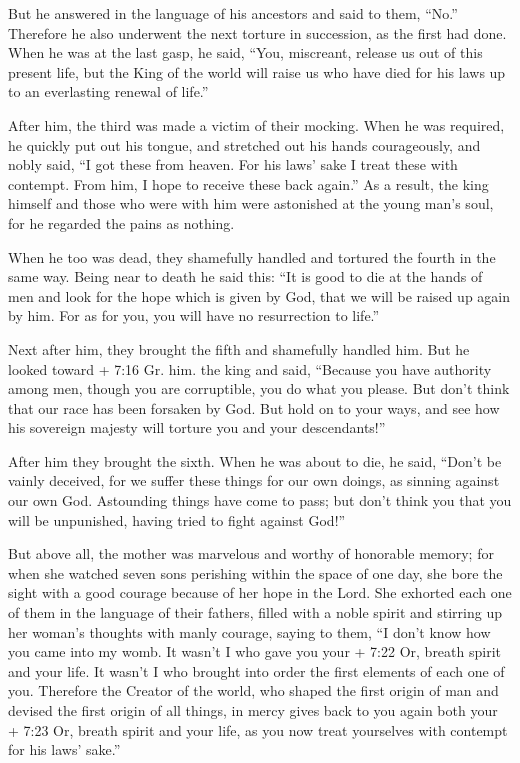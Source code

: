  But he answered in the language of his ancestors and said
to them, ``No.'' Therefore he also underwent the next torture in
succession, as the first had done.  When he was at the last
gasp, he said, ``You, miscreant, release us out of this present life,
but the King of the world will raise us who have died for his laws up to
an everlasting renewal of life.''

 After him, the third was made a victim of their mocking.
When he was required, he quickly put out his tongue, and stretched out
his hands courageously,  and nobly said, ``I got these from
heaven. For his laws' sake I treat these with contempt. From him, I hope
to receive these back again.''  As a result, the king
himself and those who were with him were astonished at the young man's
soul, for he regarded the pains as nothing.

 When he too was dead, they shamefully handled and tortured
the fourth in the same way.  Being near to death he said
this: ``It is good to die at the hands of men and look for the hope
which is given by God, that we will be raised up again by him. For as
for you, you will have no resurrection to life.''

 Next after him, they brought the fifth and shamefully
handled him.  But he looked toward + 7:16 Gr. him. the king
and said, ``Because you have authority among men, though you are
corruptible, you do what you please. But don't think that our race has
been forsaken by God.  But hold on to your ways, and see
how his sovereign majesty will torture you and your descendants!''

 After him they brought the sixth. When he was about to
die, he said, ``Don't be vainly deceived, for we suffer these things for
our own doings, as sinning against our own God. Astounding things have
come to pass;  but don't think you that you will be
unpunished, having tried to fight against God!''

 But above all, the mother was marvelous and worthy of
honorable memory; for when she watched seven sons perishing within the
space of one day, she bore the sight with a good courage because of her
hope in the Lord.  She exhorted each one of them in the
language of their fathers, filled with a noble spirit and stirring up
her woman's thoughts with manly courage, saying to them, 
``I don't know how you came into my womb. It wasn't I who gave you your
+ 7:22 Or, breath spirit and your life. It wasn't I who brought into
order the first elements of each one of you.  Therefore the
Creator of the world, who shaped the first origin of man and devised the
first origin of all things, in mercy gives back to you again both your +
7:23 Or, breath spirit and your life, as you now treat yourselves with
contempt for his laws' sake.''

